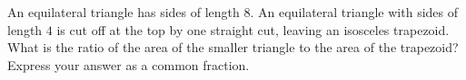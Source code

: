 An equilateral triangle has sides of length $8$. An equilateral triangle with sides of length $4$ is cut off at the top by one straight cut, leaving an isosceles trapezoid. What is the ratio of the area of the smaller triangle to the area of the trapezoid? Express your answer as a common fraction.
